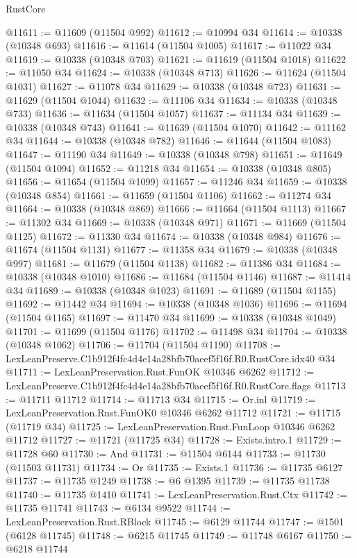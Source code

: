 \begin{lexlean}{RustCore}
\begin{coremodule}
@11611 := @11609 (@11504 @992)
@11612 := @10994 @34
@11614 := @10338 (@10348 @693)
@11616 := @11614 (@11504 @1005)
@11617 := @11022 @34
@11619 := @10338 (@10348 @703)
@11621 := @11619 (@11504 @1018)
@11622 := @11050 @34
@11624 := @10338 (@10348 @713)
@11626 := @11624 (@11504 @1031)
@11627 := @11078 @34
@11629 := @10338 (@10348 @723)
@11631 := @11629 (@11504 @1044)
@11632 := @11106 @34
@11634 := @10338 (@10348 @733)
@11636 := @11634 (@11504 @1057)
@11637 := @11134 @34
@11639 := @10338 (@10348 @743)
@11641 := @11639 (@11504 @1070)
@11642 := @11162 @34
@11644 := @10338 (@10348 @782)
@11646 := @11644 (@11504 @1083)
@11647 := @11190 @34
@11649 := @10338 (@10348 @798)
@11651 := @11649 (@11504 @1094)
@11652 := @11218 @34
@11654 := @10338 (@10348 @805)
@11656 := @11654 (@11504 @1099)
@11657 := @11246 @34
@11659 := @10338 (@10348 @854)
@11661 := @11659 (@11504 @1106)
@11662 := @11274 @34
@11664 := @10338 (@10348 @869)
@11666 := @11664 (@11504 @1113)
@11667 := @11302 @34
@11669 := @10338 (@10348 @971)
@11671 := @11669 (@11504 @1125)
@11672 := @11330 @34
@11674 := @10338 (@10348 @984)
@11676 := @11674 (@11504 @1131)
@11677 := @11358 @34
@11679 := @10338 (@10348 @997)
@11681 := @11679 (@11504 @1138)
@11682 := @11386 @34
@11684 := @10338 (@10348 @1010)
@11686 := @11684 (@11504 @1146)
@11687 := @11414 @34
@11689 := @10338 (@10348 @1023)
@11691 := @11689 (@11504 @1155)
@11692 := @11442 @34
@11694 := @10338 (@10348 @1036)
@11696 := @11694 (@11504 @1165)
@11697 := @11470 @34
@11699 := @10338 (@10348 @1049)
@11701 := @11699 (@11504 @1176)
@11702 := @11498 @34
@11704 := @10338 (@10348 @1062)
@11706 := @11704 (@11504 @1190)
@11708 := LexLeanPreserve.C1b912f4fc4d4e14a28bfb70aeef5f16f.R0.RustCore.idx40 @34
@11711 := LexLeanPreservation.Rust.FunOK @10346 @6262
@11712 := LexLeanPreserve.C1b912f4fc4d4e14a28bfb70aeef5f16f.R0.RustCore.flags
@11713 := @11711 @11712
@11714 := @11713 @34
@11715 := Or.inl
@11719 := LexLeanPreservation.Rust.FunOK0 @10346 @6262 @11712
@11721 := @11715 (@11719 @34)
@11725 := LexLeanPreservation.Rust.FunLoop @10346 @6262 @11712
@11727 := @11721 (@11725 @34)
@11728 := Exists.intro.{1}
@11729 := @11728 @60
@11730 := And
@11731 := @11504 @6144
@11733 := @11730 (@11503 @11731)
@11734 := Or
@11735 := Exists.{1}
@11736 := @11735 @6127
@11737 := @11735 @1249
@11738 := @6 @1395
@11739 := @11735 @11738
@11740 := @11735 @1410
@11741 := LexLeanPreservation.Rust.Ctx
@11742 := @11735 @11741
@11743 := @6134 @9522
@11744 := LexLeanPreservation.Rust.RBlock
@11745 := @6129 @11744
@11747 := @1501 (@6128 @11745)
@11748 := @6215 @11745
@11749 := @11748 @6167
@11750 := @6218 @11744

\end{coremodule}
\end{lexlean}
